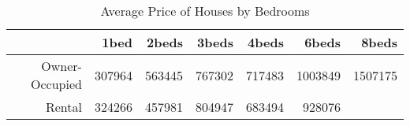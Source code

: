 \begin{table}[ht]
\centering
\begin{tabular}{rrrrrrr}
  \hline
 & 1bed & 2beds & 3beds & 4beds & 6beds & 8beds \\ 
  \hline
Owner-Occupied & 307964 & 563445 & 767302 & 717483 & 1003849 & 1507175 \\ 
  Rental & 324266 & 457981 & 804947 & 683494 & 928076 &  \\ 
   \hline
\end{tabular}
\caption{Average Price of Houses by Bedrooms} 
\label{tab:avg_price_by_bed}
\end{table}
